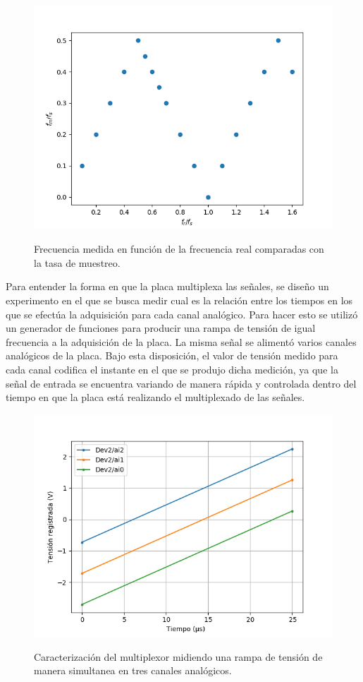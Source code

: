 \documentclass[a4paper,11pt]{article}
\begin{document}
\begin{figure}[h!]
\centering
\includegraphics[width=\columnwidth]{figs/alliasing.png}
\label{fig:aliasing}
\caption{Frecuencia medida en función de la frecuencia real comparadas con la tasa de muestreo.}
\end{figure}

Para entender la forma en que la placa multiplexa las señales, se diseño un experimento en el que se busca medir cual es la relación entre los tiempos en los que se efectúa la adquisición para cada canal analógico. Para hacer esto se utilizó un generador de funciones para producir una rampa de tensión de igual frecuencia a la adquisición de la placa. La misma señal se alimentó varios canales analógicos de la placa. Bajo esta disposición, el valor de tensión medido para cada canal codifica el instante en el que se produjo dicha medición, ya que la señal de entrada se encuentra variando de manera rápida y controlada dentro del tiempo en que la placa está realizando el multiplexado de las señales. 

\begin{figure}[h!]
\centering
\includegraphics[width=\columnwidth]{figs/multiplex.png}
\label{fig:multiplex}
\caption{Caracterización del multiplexor midiendo una rampa de tensión de manera simultanea en tres canales analógicos.}
\end{figure}
\end{document}
